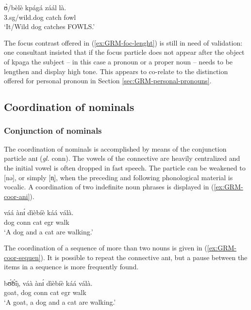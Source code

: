 \begin{exe}
\begin{exe}
\begin{exe}
{\begin{exe}
\begin{exe}
\begin{exe}
\begin{exe}
\begin{exe}
\begin{exe}
\begin{exe}
\begin{exe}
\begin{exe}
\begin{exe}
\begin{exe}
\begin{exe}
\ex\label{ex:GRM-foc-w-lenght-2} 
\gll  ʊ̀/bèlè kpágá záál là.\\
 {\sc 3.sg}/wild.dog catch fowl {\foc}\\
 \glt  `It/Wild dog catches FOWLS.'

\z
\z


The focus contrast offered in (\ref{ex:GRM-foc-lenght}) is still in need of validation:  one 
consultant insisted that if the focus particle does not appear after the object of {\sls kpaga} the 
subject --  in this case a pronoun or a proper noun -- needs to be lengthen and display high tone. 
This appears to co-relate to the distinction offered for personal pronoun in Section 
\ref{sec:GRM-personal-pronouns}.


\subsection{Coordination of nominals}
\label{sec:GRM-coord-nom}

\subsubsection{Conjunction of nominals}
\label{sec:GRM-conjunc-nom}



The coordination of nominals is accomplished by means of the conjunction
particle {\sls anɪ} ({\it gl.} {\sc conn}).  The vowels of the connective are 
heavily
centralized and the initial vowel is often dropped in fast speech.
The particle can be weakened to [nə], or simply [n̩], when the preceding and
following phonological material is vocalic.  A coordination of two indefinite
noun phrases is displayed in (\ref{ex:GRM-coor-ani}). 

\begin{exe}
 \ex\label{ex:GRM-coor-ani} 
 
 \gll váá ànɪ́ dìèbíè káá válà.\\
dog {\sc conn} cat {\sc  egr} walk\\
 \glt  `A dog and a cat are walking.'
\z

 The coordination of a sequence of
 more than two nouns is given in (\ref{ex:GRM-coor-sequen}). It is possible to
repeat the 
connective {\sls anɪ}, but a pause between the items in a
sequence is more
frequently found. 

\begin{exe}
 \ex\label{ex:GRM-coor-sequen} 
 
 \gll  bʊ̃́ʊ̃́ŋ, váà ànɪ́ dìèbíè káá válà.\\
 goat,  dog {\sc conn} cat {\sc  egr} walk\\
 \glt   `A goat, a dog and a cat are walking.'
\z


\end{exe}
\end{exe}
\end{exe}
\end{exe}
\end{exe}
\end{exe}
\end{exe}
\end{exe}
\end{exe}
\end{exe}
\end{exe}
\end{exe}
\end{exe}
\end{exe}}
\end{exe}
\end{exe}
\end{exe}
